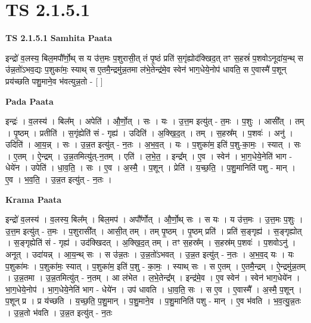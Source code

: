 \documentclass[17pt]{extarticle}
\begin{document}
\section*{ TS 2.1.5.1 }

\textbf{TS 2.1.5.1 } \newline
\textbf{Samhita Paata} \newline

इन्द्रो॑ व॒लस्य॒ बिल॒मपौ᳚र्णो॒थ् स य उ॑त्त॒मः प॒शुरासी॒त् तं पृ॒ष्ठं प्रति॑ स॒गृंह्योद॑क्खिद॒त् तꣳ स॒हस्रं॑ प॒शवोऽनूदा॑य॒न्थ् स उ॑न्न॒तो॑ऽभव॒द्यः प॒शुका॑मः॒ स्याथ् स ए॒तमै॒न्द्रमु॑न्न॒तमा ल॑भे॒तेन्द्र॑मे॒व स्वेन॑ भाग॒धेये॒नोप॑ धावति॒ स ए॒वास्मै॑ प॒शून् प्रय॑च्छति पशु॒माने॒व भ॑वत्युन्न॒तो -  [  ] \newline

\textbf{Pada Paata} \newline

इन्द्रः॑ । व॒लस्य॑ । बिल᳚म् । अपेति॑ । औ॒र्णो॒त् । सः । यः । उ॒त्त॒म इत्यु॑त् - त॒मः । प॒शुः । आसी᳚त् । तम् । पृ॒ष्ठम् । प्रतीति॑ । स॒गृंह्येति॑ सं - गृह्य॑ । उदिति॑ । अ॒क्खि॒द॒त् । तम् । स॒हस्र᳚म् । प॒शवः॑ । अनु॑ । उदिति॑ । आ॒य॒न्न् । सः । उ॒न्न॒त इत्यु॑त् - न॒तः । अ॒भ॒व॒त् । यः । प॒शुका॑म॒ इति॑ प॒शु-का॒मः॒ । स्यात् । सः । ए॒तम् । ऐ॒न्द्रम् । उ॒न्न॒तमित्यु॑त्-न॒तम् । एति॑ । ल॒भे॒त॒ । इन्द्र᳚म् । ए॒व । स्वेन॑ । भा॒ग॒धेये॒नेति॑ भाग - धेये॑न । उपेति॑ । धा॒व॒ति॒ । सः । ए॒व । अ॒स्मै॒ । प॒शून् । प्रेति॑ । य॒च्छ॒ति॒ । प॒शु॒मानिति॑ पशु - मान् । ए॒व । भ॒व॒ति॒ । उ॒न्न॒त इत्यु॑त् - न॒तः ।  \newline


\textbf{Krama Paata} \newline

इन्द्रो॑ व॒लस्य॑ । व॒लस्य॒ बिल᳚म् । बिल॒मप॑ । अपौ᳚र्णोत् । औ॒र्णो॒थ् सः । स यः । य उ॑त्त॒मः । उ॒त्त॒मः प॒शुः । उ॒त्त॒म इत्यु॑त् - त॒मः । प॒शुरासी᳚त् । आसी॒त् तम् । तम् पृ॒ष्ठम् । पृ॒ष्ठम् प्रति॑ । प्रति॑ स॒ङ्गृह्य॑ । स॒ङ्गृह्योत् । स॒ङ्गृह्येति॑ सं - गृह्य॑ । उद॑क्खिदत् । अ॒क्खि॒द॒त् तम् । तꣳ स॒हस्र᳚म् । स॒हस्र॑म् प॒शवः॑ । प॒शवोऽनु॑ । अनूत् । उदा॑यन्न् । आ॒य॒न्थ् सः । स उ॑न्न॒तः । उ॒न्न॒तो॑ऽभवत् । उ॒न्न॒त इत्यु॑त् - न॒तः । अ॒भ॒व॒द् यः । यः प॒शुका॑मः । प॒शुका॑मः॒ स्यात् । प॒शुका॑म॒ इति॑ प॒शु - का॒मः॒ । स्याथ् सः । स ए॒तम् । ए॒तमै॒न्द्रम् । ऐ॒न्द्रमु॑न्न॒तम् । उ॒न्न॒तमा । उ॒न्न॒तमित्यु॑त् - न॒तम् । आ ल॑भेत । ल॒भे॒तेन्द्र᳚म् । इन्द्र॑मे॒व । ए॒व स्वेन॑ । स्वेन॑ भाग॒धेये॑न । भा॒ग॒धेये॒नोप॑ । भा॒ग॒धेये॒नेति॑ भाग - धेये॑न । उप॑ धावति । धा॒व॒ति॒ सः । स ए॒व । ए॒वास्मै᳚ । अ॒स्मै॒ प॒शून् । प॒शून् प्र । प्र य॑च्छति । य॒च्छ॒ति॒ प॒शु॒मान् । प॒शु॒माने॒व । प॒शु॒मानिति॑ पशु - मान् । ए॒व भ॑वति । भ॒व॒त्यु॒न्न॒तः । उ॒न्न॒तो भ॑वति । उ॒न्न॒त इत्यु॑त् - न॒तः \newline
\end{document}
